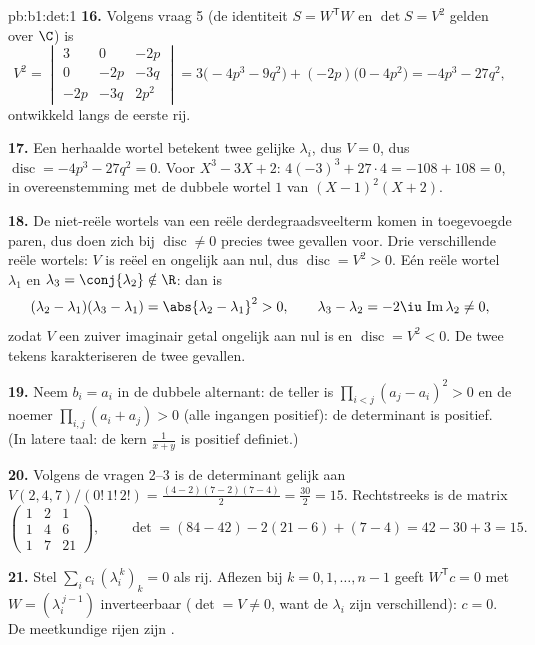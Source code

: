 \begin{solution}{pb:b1:det:1}
\textbf{16.} Volgens vraag 5 (de identiteit $S = W^{\mathsf T}W$ en
$\det S = V^2$ gelden over $\C$) is
\[
V^2 = \begin{vmatrix}
3 & 0 & -2p\\
0 & -2p & -3q\\
-2p & -3q & 2p^2
\end{vmatrix}
= 3\bigl(-4p^3 - 9q^2\bigr) + (-2p)\bigl(0 - 4p^2\bigr)
= -4p^3 - 27q^2 ,
\]
ontwikkeld langs de eerste rij.

\textbf{17.} Een herhaalde wortel betekent twee gelijke
$\lambda_i$, dus $V = 0$, dus $\operatorname{disc} = -4p^3 - 27q^2
= 0$. Voor $X^3 - 3X + 2$: $4(-3)^3 + 27\cdot4 = -108 + 108 = 0$,
in overeenstemming met de dubbele wortel $1$ van $(X-1)^2(X+2)$.

\textbf{18.} De niet-reële wortels van een reële
derdegraadsveelterm komen in toegevoegde paren, dus doen zich bij
$\operatorname{disc} \neq 0$ precies twee gevallen voor. Drie
verschillende reële wortels: $V$ is reëel en ongelijk aan nul, dus
$\operatorname{disc} = V^2 > 0$. Eén reële wortel $\lambda_1$ en
$\lambda_3 = \conj{\lambda_2} \notin \R$: dan is
\[
(\lambda_2 - \lambda_1)(\lambda_3 - \lambda_1) =
\abs{\lambda_2 - \lambda_1}^2 > 0,
\qquad
\lambda_3 - \lambda_2 = -2\iu\,\operatorname{Im}\lambda_2 \neq 0,
\]
zodat $V$ een zuiver imaginair getal ongelijk aan nul is en
$\operatorname{disc} = V^2 < 0$. De twee tekens karakteriseren de
twee gevallen.

\textbf{19.} Neem $b_i = a_i$ in de dubbele alternant: de teller is
$\prod_{i<j}(a_j - a_i)^2 > 0$ en de noemer $\prod_{i,j}(a_i + a_j)
> 0$ (alle ingangen positief): de determinant is positief. (In
latere taal: de kern $\frac1{x+y}$ is positief definiet.)

\textbf{20.} Volgens de vragen 2--3 is de determinant gelijk aan
$V(2,4,7)/(0!\,1!\,2!) = \frac{(4-2)(7-2)(7-4)}{2} = \frac{30}{2} =
15$. Rechtstreeks is de matrix
\[
\begin{pmatrix}
1 & 2 & 1\\
1 & 4 & 6\\
1 & 7 & 21
\end{pmatrix},
\qquad
\det = (84 - 42) - 2(21 - 6) + (7 - 4) = 42 - 30 + 3 = 15 .
\]

\textbf{21.} Stel $\sum_i c_i\,(\lambda_i^{\,k})_{k} = 0$ als rij.
Aflezen bij $k = 0, 1, \dots, n-1$ geeft $W^{\mathsf T}c = 0$ met
$W = (\lambda_i^{\,j-1})$ inverteerbaar ($\det = V \neq 0$, want de
$\lambda_i$ zijn verschillend): $c = 0$. De meetkundige rijen zijn
.


\end{solution}
